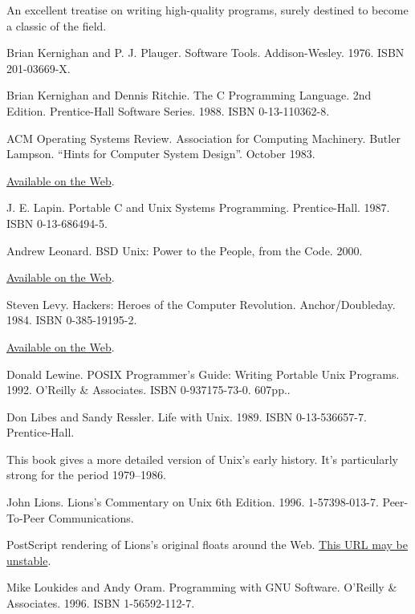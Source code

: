 \documentclass[12pt,oneside]{book}
\begin{document}
\begin{thebibliography}{9}
An excellent treatise on writing high-quality programs, surely destined to become a classic of the field.

 Brian Kernighan and P. J. Plauger. Software Tools. Addison-Wesley. 1976. ISBN 201-03669-X.

 Brian Kernighan and Dennis Ritchie. The C Programming Language. 2nd Edition. Prentice-Hall Software Series. 1988. ISBN 0-13-110362-8.

 ACM Operating Systems Review. Association for Computing Machinery. Butler Lampson. “Hints for Computer System Design”. October 1983.

\href{http://research.microsoft.com/~lampson/33-Hints/WebPage.html}{Available on the Web}.

 J. E. Lapin. Portable C and Unix Systems Programming. Prentice-Hall. 1987. ISBN 0-13-686494-5.

 Andrew Leonard. BSD Unix: Power to the People, from the Code. 2000.

\href{http://dir.salon.com/tech/fsp/2000/05/16/chapter_2_part_one/index.html}{Available on the Web}.

 Steven Levy. Hackers: Heroes of the Computer Revolution. Anchor/Doubleday. 1984. ISBN 0-385-19195-2.

\href{http://www.stanford.edu/group/mmdd/SiliconValley/Levy/Hackers.1984.book/contents.html}{Available on the Web}.

 Donald Lewine. POSIX Programmer's Guide: Writing Portable Unix Programs. 1992. O'Reilly \&{} Associates. ISBN 0-937175-73-0. 607pp..

 Don Libes and Sandy Ressler. Life with Unix. 1989. ISBN 0-13-536657-7. Prentice-Hall.

This book gives a more detailed version of Unix's early history. It's particularly strong for the period 1979–1986.

 John Lions. Lions's Commentary on Unix 6th Edition. 1996. 1-57398-013-7. Peer-To-Peer Communications.

PostScript rendering of Lions's original floats around the Web. \href{http://www.upl.cs.wisc.edu/~epaulson/lionc.ps}{This URL may be unstable}.

 Mike Loukides and Andy Oram. Programming with GNU Software. O'Reilly \&{} Associates. 1996. ISBN 1-56592-112-7.


\end{thebibliography}
\end{document}

